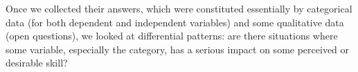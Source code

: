 \documentclass{sigchi}
\begin{document}
Once we collected their answers, which were constituted essentially by categorical data (for both dependent and independent variables) and some qualitative data (open questions), we looked at differential patterns: are there situations where some variable, especially the category, has a serious impact on some perceived or desirable skill?
 
%
%
%
\end{document}
